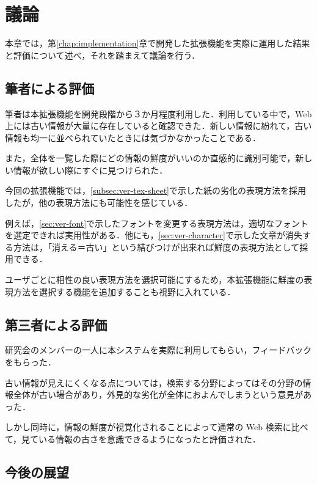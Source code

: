 \chapter{議論}
\label{chap:discussion}

本章では，第\ref{chap:implementation}章で開発した拡張機能を実際に運用した結果と評価について述べ，それを踏まえて議論を行う．

\newpage

\section{筆者による評価}

筆者は本拡張機能を開発段階から３か月程度利用した．利用している中で，Web 上には古い情報が大量に存在していると確認できた．新しい情報に紛れて，古い情報も均一に並べられていたときには気づかなかったことである．

また，全体を一覧した際にどの情報の鮮度がいいのか直感的に識別可能で，新しい情報が欲しい際にすぐに見つけられた．

今回の拡張機能では，\ref{subsec:ver-tex-sheet}で示した紙の劣化の表現方法を採用したが，他の表現方法にも可能性を感じている．

例えば，\ref{sec:ver-font}で示したフォントを変更する表現方法は，適切なフォントを選定できれば実用性がある．他にも，\ref{sec:ver-character}で示した文章が消失する方法は，「消える＝古い」という結びつけが出来れば鮮度の表現方法として採用できる．

ユーザごとに相性の良い表現方法を選択可能にするため，本拡張機能に鮮度の表現方法を選択する機能を追加することも視野に入れている．

\section{第三者による評価}
\label{sec:dis_third}

研究会のメンバーの一人に本システムを実際に利用してもらい，フィードバックをもらった．

古い情報が見えにくくなる点については，検索する分野によってはその分野の情報全体が古い場合があり，外見的な劣化が全体におよんでしまうという意見があった．

しかし同時に，情報の鮮度が視覚化されることによって通常の Web 検索に比べて，見ている情報の古さを意識できるようになったと評価された．

\section{今後の展望}

